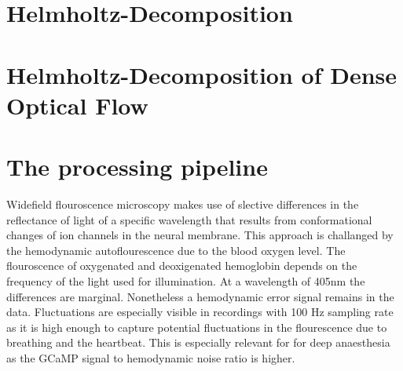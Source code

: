 \section{Helmholtz-Decomposition}

\section{Helmholtz-Decomposition of Dense Optical Flow}

\section{The processing pipeline}
Widefield flouroscence microscopy makes use of slective differences in the reflectance of light of a specific wavelength that results from conformational changes of ion channels in the neural membrane. This approach is challanged by the hemodynamic autoflourescence due to the blood oxygen level. The flouroscence of oxygenated and deoxigenated hemoglobin depends on the frequency of the light used for illumination. At a wavelength of 405nm the differences are marginal. Nonetheless a hemodynamic error signal remains in the data. Fluctuations are especially visible in recordings with 100 Hz sampling rate as it is high enough to capture potential fluctuations in the flourescence due to breathing and the heartbeat. This is especially relevant for for deep anaesthesia as the GCaMP signal to hemodynamic noise ratio is higher.\\
